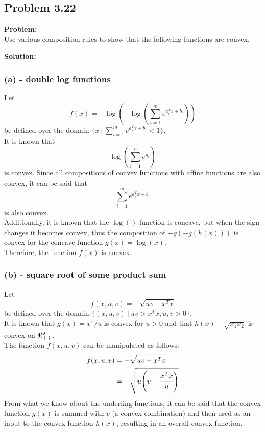 \documentclass[letter]{article}
\begin{document}
\newpage
\subsection{Problem 3.22}
\textbf{Problem:}\\
Use various composition rules to show that the following functions are convex.

\noindent
\textbf{Solution:}\\
\subsubsection{(a) - double log functions}
Let $$f(x) = -\log(-\log(\sum_{i=1}^m e^{a_i^T x + b_i}))$$ be defined over the domain $\{x \ | \ \sum_{i=1}^m e^{a_i^T x + b_i} < 1\}$.\\
It is known that $$\log(\sum_{i=1}^{n} e^{y_i})$$ is convex. Since all compositions of convex functions with affine functions are also convex, it can be said that $$\sum_{i=1}^m e^{a_i^T x + b_i}$$ is also convex.\\
Additionally, it is known that the $\log()$ function is concave, but when the sign changes it becomes convex, thus the composition of $-g(-g(h(x)))$ is convex for the concave function $g(x) = \log(x)$.\\
Therefore, the function $f(x)$ is convex.

\subsubsection{(b) - square root of some product sum}
Let $$f(x,u,v) = - \sqrt{uv - x^T x}$$ be defined over the domain $\{(x,u,v) \ | \ uv > x^T x, u, v > 0\}$.\\
It is known that $g(x) = x^x / u$ is convex for $u>0$ and that $h(x)-\sqrt{x_1 x_2}$ is convex on $\real_{++}^2$.\\
The function $f(x,u,v)$ can be manipulated as follows:
\begin{align*}
	f(x,u,v) 	&= - \sqrt{uv - x^T x}\\
				&= - \sqrt{u \qty(v -\cfrac{x^T x}{u})}
\end{align*}
From what we know about the underling functions, it can be said that the convex function $g(x)$ is summed with $v$ (a convex combination) and then used as an input to the convex function $h(x)$, resulting in an overall convex function.

\newpage
\end{document}
